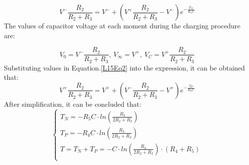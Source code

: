     \begin{equation*}
        V^-\frac{R_2}{R_2+R_3}=V^-+(V^+\frac{R_2}{R_2+R_3}-V^-)e^{-\frac{T_N}{R_5C}}
    \end{equation*}
    \FloatBarrier
    The values of capacitor voltage at each moment during the charging procedure are:\par
    \begin{equation}
        V_0=V^-\frac{R_2}{R_2+R_3},~V_\infty=V^+,~V_C=V^+\frac{R_2}{R_2+R_3}
    \label{L15Eq2}
    \end{equation}
    \FloatBarrier
    Substituting values in Equation.\ref{L15Eq2} into the expression, it can be obtained that:
    \begin{equation*}
        V^+\frac{R_2}{R_2+R_3}=V^++(V^-\frac{R_2}{R_2+R_3}-V^+)e^{-\frac{T_P}{R_4C}}
    \end{equation*}
    \FloatBarrier
    After simplification, it can be concluded that:
    \begin{equation*}
        \begin{cases}
            T_N=-R_5C\cdot ln(\frac{R_3}{2R_2+R_3})\\
            T_P=-R_4C\cdot ln(\frac{R_3}{2R_2+R_3})\\
            T=T_N+T_P=-C\cdot ln(\frac{R_3}{2R_2+R_3})\cdot (R_4+R_5)\\
        \end{cases}
    \end{equation*}
    \FloatBarrier
    
